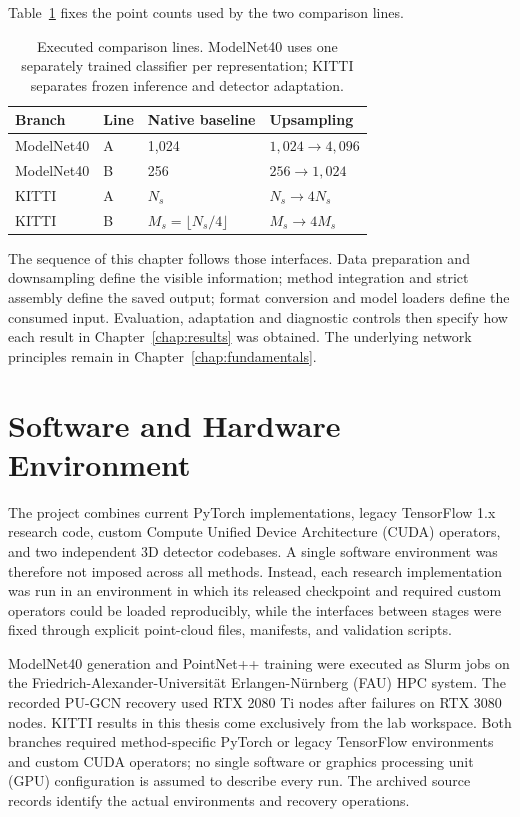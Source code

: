 Table~\ref{tab:lines} fixes the point counts used by the two comparison lines.

\begin{table}[t]\centering
\begin{tabular}{llll}\toprule
Branch & Line & Native baseline & Upsampling \\
\midrule
ModelNet40 & A & 1,024 & $1,024\rightarrow4,096$ \\
ModelNet40 & B & 256 & $256\rightarrow1,024$ \\
KITTI & A & $N_s$ & $N_s\rightarrow4N_s$ \\
KITTI & B & $M_s=\lfloor N_s/4\rfloor$ & $M_s\rightarrow4M_s$ \\
\bottomrule\end{tabular}
\caption{Executed comparison lines.
ModelNet40 uses one separately trained classifier per representation;
KITTI separates frozen inference and detector adaptation.}\label{tab:lines}
\end{table}

The sequence of this chapter follows those interfaces. Data preparation
and downsampling define the visible information; method integration and
strict assembly define the saved output; format conversion and model
loaders define the consumed input. Evaluation, adaptation and diagnostic
controls then specify how each result in Chapter~\ref{chap:results} was
obtained. The underlying network principles remain in
Chapter~\ref{chap:fundamentals}.

\section{Software and Hardware Environment}
\label{sec:fc-4-2}

The project combines current PyTorch implementations, legacy TensorFlow 1.x research code, custom Compute Unified Device Architecture (CUDA) operators, and two independent 3D detector codebases. A single software environment was therefore not imposed across all methods. Instead, each research implementation was run in an environment in which its released checkpoint and required custom operators could be loaded reproducibly, while the interfaces between stages were fixed through explicit point-cloud files, manifests, and validation scripts.

ModelNet40 generation and PointNet++ training were executed as Slurm jobs on the Friedrich-Alexander-Universit\"at Erlangen-N\"urnberg (FAU) HPC system. The recorded PU-GCN recovery used RTX 2080 Ti nodes after failures on RTX 3080 nodes. KITTI results in this thesis come exclusively from the lab workspace. Both branches required method-specific PyTorch or legacy TensorFlow environments and custom CUDA operators; no single software or graphics processing unit (GPU) configuration is assumed to describe every run. The archived source records identify the actual environments and recovery operations.

